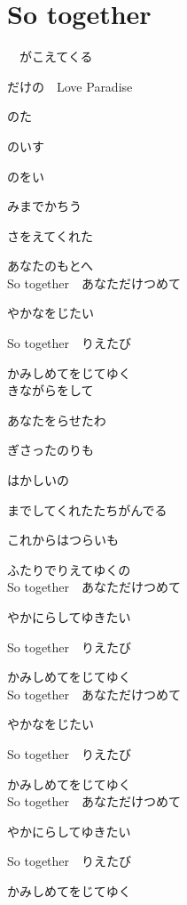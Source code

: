 \section{ So together}
\large{

　がこえてくる

だけの　Love Paradise

のた

のいす

のをい

みまでかちう

さをえてくれた

あなたのもとへ
\\

So together　あなただけつめて

やかなをじたい

So together　りえたび

かみしめてをじてゆく
\\

きながらをして

あなたをらせたわ

ぎさったのりも

はかしいの

までしてくれたたちがんでる

これからはつらいも

ふたりでりえてゆくの
\\

So together　あなただけつめて

やかにらしてゆきたい

So together　りえたび

かみしめてをじてゆく
\\

So together　あなただけつめて

やかなをじたい

So together　りえたび

かみしめてをじてゆく
\\

So together　あなただけつめて

やかにらしてゆきたい

So together　りえたび

かみしめてをじてゆく

}
{ \ }

